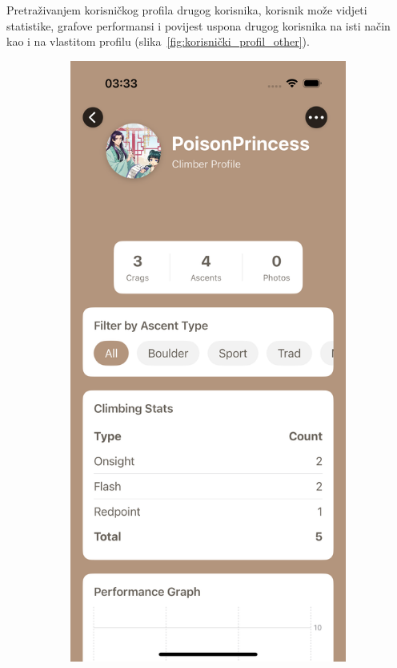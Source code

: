 Pretraživanjem korisničkog profila drugog korisnika, korisnik može vidjeti statistike, grafove performansi i povijest uspona drugog korisnika na isti način kao i na vlastitom profilu (slika~\ref{fig:korisnički_profil_other}).


\begin{figure}[H]
    \centering
    \begin{subfigure}[b]{0.33\textwidth}
        \centering
        \includegraphics[width=\textwidth]{images/implementacija/user-profile-other.png}

\end{subfigure}
\end{figure}
